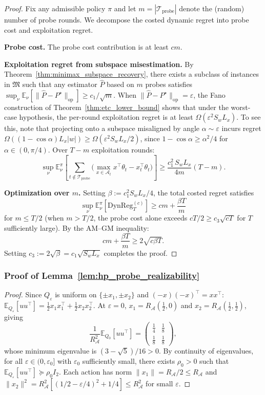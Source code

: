 \documentclass{article}
\newcommand{\E}{\mathbb{E}}
\newcommand{\op}{\mathrm{op}}
\newcommand{\cA}{\mathcal{A}}
\newcommand{\cTprobe}{\mathcal{T}_{\mathrm{probe}}}
\newcommand{\DynReg}{\mathrm{DynReg}}
\begin{document}
\begin{proof}
Fix any admissible policy $\pi$ and let $m = |\cTprobe|$ denote the (random) number of probe rounds.  We decompose the costed dynamic regret into probe cost and exploitation regret.

\textbf{Probe cost.}
The probe cost contribution is at least $cm$.

\textbf{Exploitation regret from subspace misestimation.}
By Theorem~\ref{thm:minimax_subspace_recovery}, there exists a subclass of instances in $\mathfrak{M}$ such that any estimator $\widehat{P}$ based on $m$ probes satisfies $\sup_\nu \E_\nu[\|\widehat{P} - P^\star\|_{\op}] \ge c_1/\sqrt{m}$.
When $\|\widehat{P} - P^\star\|_{\op} = \varepsilon$, the Fano construction of Theorem~\ref{thm:etc_lower_bound} shows that under the worst-case hypothesis, the per-round exploitation regret is at least $\Omega(\varepsilon^2 S_w L_x)$.  To see this, note that projecting onto a subspace misaligned by angle $\alpha \sim \varepsilon$ incurs regret $\Omega((1-\cos\alpha) L_x |w|) \ge \Omega(\varepsilon^2 S_w L_x/2)$, since $1 - \cos\alpha \ge \alpha^2/4$ for $\alpha \in (0, \pi/4)$.  Over $T - m$ exploitation rounds:
\[
\sup_\nu \E_\nu^\pi\!\left[\sum_{t \notin \cTprobe} \bigl(\max_{x \in \cA_t} x^\top\theta_t - x_t^\top\theta_t\bigr)\right]
\ge \frac{c_1^2\, S_w L_x}{4m} (T - m).
\]

\textbf{Optimization over $m$.}
Setting $\beta := c_1^2 S_w L_x / 4$, the total costed regret satisfies
\[
\sup_\nu \E_\nu^\pi[\DynReg_T^{(c)}] \ge cm + \frac{\beta T}{m}
\]
for $m \le T/2$ (when $m > T/2$, the probe cost alone exceeds $cT/2 \ge c_3\sqrt{cT}$ for $T$ sufficiently large).  By the AM--GM inequality:
\[
cm + \frac{\beta T}{m} \ge 2\sqrt{c\beta T}.
\]
Setting $c_3 := 2\sqrt{\beta} = c_1\sqrt{S_w L_x}$ completes the proof.
\end{proof}

\subsubsection{Proof of Lemma~\ref{lem:hp_probe_realizability}}
\label{proof:hp_probe_realizability}

\begin{proof}
Since $Q_\varepsilon$ is uniform on $\{\pm x_1, \pm x_2\}$ and $(-x)(-x)^\top = xx^\top$:
$\E_{Q_\varepsilon}[uu^\top] = \frac{1}{2}x_1 x_1^\top + \frac{1}{2}x_2 x_2^\top$.
At $\varepsilon = 0$, $x_1 = R_{\cA}(\frac{1}{2}, 0)$ and $x_2 = R_{\cA}(\frac{1}{2}, \frac{1}{2})$, giving
\[
\frac{1}{R_{\cA}^2}\E_{Q_0}[uu^\top]
= \begin{pmatrix} \frac{1}{4} & \frac{1}{8} \\[2pt] \frac{1}{8} & \frac{1}{8} \end{pmatrix},
\]
whose minimum eigenvalue is $(3-\sqrt{5})/16 > 0$.
By continuity of eigenvalues, for all $\varepsilon \in (0, \varepsilon_0]$ with $\varepsilon_0$ sufficiently small, there exists $\rho_0 > 0$ such that $\E_{Q_\varepsilon}[uu^\top] \succeq \rho_0 I_2$.
Each action has norm $\|x_1\| = R_{\cA}/2 \le R_{\cA}$ and $\|x_2\|^2 = R_{\cA}^2[(1/2 - \varepsilon/4)^2 + 1/4] \le R_{\cA}^2$ for small $\varepsilon$.
\end{proof}
\end{document}
